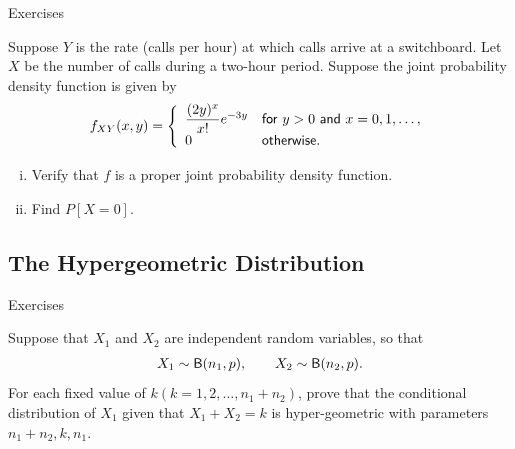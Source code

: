 \begin{frame}{Exercises}

\justifying
{} Suppose $Y$ is the rate (calls per hour) at which calls arrive at a switchboard. Let $X$ be the number of calls during a two-hour period. Suppose the joint probability density function is given by
\begin{align*}
f_{XY}(x, y) = \left\{
\begin{array}{ll}
\dfrac{(2y)^x}{x!} e^{-3y} & \mathsf{for\ } y > 0 \mathsf{\ and\ } x = 0, 1, \ldots, \\
0 & \mathsf{otherwise}.
\end{array}
\right.
\end{align*}
\begin{enumerate}[(i).]
	\justifying
	\item Verify that $f$ is a proper joint probability density function.
	\item Find $P[X = 0]$.
\end{enumerate}

\end{frame}


\subsection{The Hypergeometric Distribution}


\begin{frame}{Exercises}

\justifying
{} Suppose that $X_1$ and $X_2$ are independent random variables, so that
\begin{align*}
X_1\sim \mathsf{B}(n_1, p), \qquad X_2\sim \mathsf{B}(n_2, p).
\end{align*}
For each fixed value of $k (k = 1, 2,\ldots, n_1 + n_2)$, prove that the conditional distribution of $X_1$ given that $X_1 + X_2 = k$ is hyper-geometric with parameters $n_1 + n_2, k, n_1$.

\end{frame}

